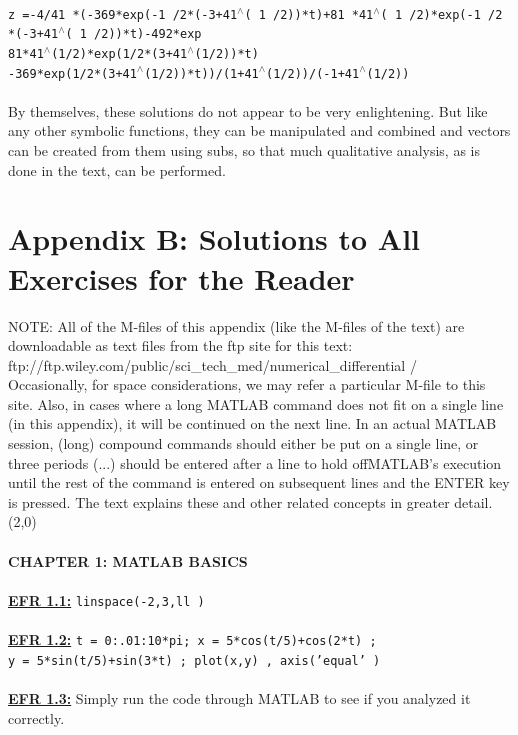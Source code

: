 \documentclass[../main.tex]{subfiles}
\begin{document}
\\
\texttt{z =-4/41 *(-369*exp(-1 /2*(-3+41$^{\wedge}$( 1 /2))*t)+81 *41$^{\wedge}$( 1 /2)*exp(-1 /2 *(-3+41$^{\wedge}$( 1 /2))*t)-492*exp}\\
\texttt{81*41$^{\wedge}$(1/2)*exp(1/2*(3+41$^{\wedge}$(1/2))*t)}\\
\texttt{-369*exp(1/2*(3+41$^{\wedge}$(1/2))*t))/(1+41$^{\wedge}$(1/2))/(-1+41$^{\wedge}$(1/2))}
\\
\\
By themselves, these solutions do not appear to be very enlightening. But like any 
other symbolic functions, they can be manipulated and combined and vectors can 
be created from them using subs, so that much qualitative analysis, as is done in 
the text, can be performed.
\newpage
\newpage
\section{Appendix B: Solutions to All Exercises for the 
Reader }
NOTE: All of the M-files of this appendix (like the M-files of the text) are downloadable as text files 
from the ftp site for this text: \\
ftp://ftp.wiley.com/public/sci\_tech\_med/numerical\_differential / 
\\
Occasionally, for space considerations, we may refer a particular M-file to this site. Also, in cases 
where a long MATLAB command does not fit on a single line (in this appendix), it will be continued 
on the next line. In an actual MATLAB session, (long) compound commands should either be put on a 
single line, or three periods (...) should be entered after a line to hold offMATLAB's execution until 
the rest of the command is entered on subsequent lines and the ENTER key is pressed. The text 
explains these and other related concepts in greater detail. \\
\line(2,0){\textwidth}\\
\\
\textbf{CHAPTER 1: MATLAB BASICS }\\
\\
\textbf{\underline{EFR 1.1:}} \texttt{linspace(-2,3,ll )} \\
\\
\textbf{\underline{EFR 1.2:}} \texttt{t = 0:.01:10*pi; x = 5*cos(t/5)+cos(2*t) ;} \\
\texttt{y = 5*sin(t/5)+sin(3*t) ; plot(x,y) , axis('equal' ) }
\\
\\
\textbf{\underline{EFR 1.3:}} Simply run the code through MATLAB to see if you analyzed it correctly.
\end{document}
